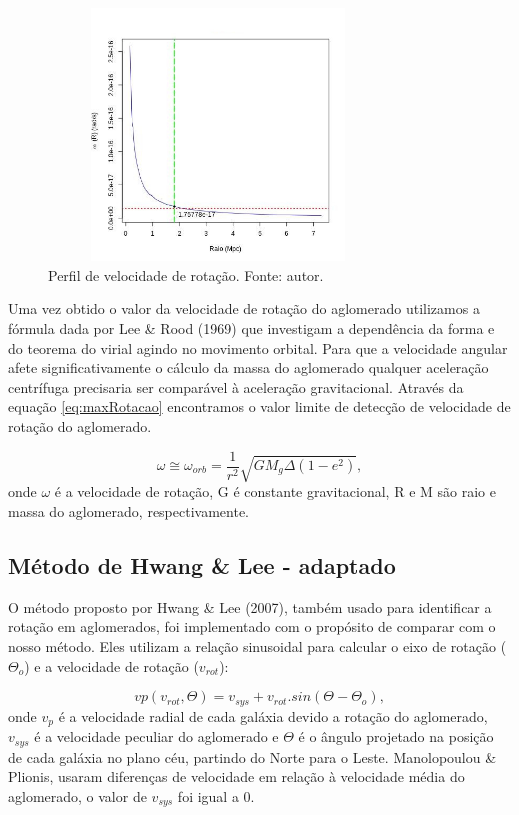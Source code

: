 \begin{figure}[!htbp] %
\vspace{-2pt}
\begin{center}
\includegraphics[height=6.7cm,width=9cm]{04-figuras/rotacao}%
\caption{Perfil de velocidade de rotação. Fonte: autor.}
\label{rotacao}%
\end{center}
\end{figure}

Uma vez obtido o valor da velocidade de rotação do aglomerado utilizamos a fórmula dada por Lee \& Rood (1969) que investigam a dependência da forma e do teorema do virial agindo no movimento orbital. Para que a velocidade angular afete significativamente o cálculo da massa do aglomerado qualquer aceleração centrífuga precisaria ser comparável à aceleração gravitacional. Através da equação \ref{eq:maxRotacao} encontramos o valor limite de detecção de velocidade de rotação do aglomerado.

\begin{equation}
\omega \cong \omega_{orb} = \frac{1}{r^2} \sqrt{G M_g \Delta (1 - e^2)}, 
\label{eq:maxRotacao}
\end{equation}
onde $\omega$ é a velocidade de rotação, G é constante gravitacional, R e M são raio e massa do aglomerado, respectivamente. 

\subsection{Método de Hwang \& Lee - adaptado}

O método proposto por Hwang \& Lee (2007), também usado para identificar a rotação em aglomerados, foi implementado com o propósito de comparar com o nosso método. Eles utilizam a relação sinusoidal para calcular o eixo de rotação ($\Theta_o$) e a velocidade de rotação ($v_{rot}$):

\begin{equation}
 vp(v_{rot}, \Theta) = v_{sys} + v_{rot} . sin(\Theta - \Theta_o) ,
 \label{eq:hwanglee1}
\end{equation}
onde $v_p$ é a velocidade radial de cada galáxia devido a rotação do aglomerado, $v_{sys}$ é a velocidade peculiar do aglomerado e $\Theta$ é o ângulo projetado na posição de cada galáxia no plano céu, partindo do Norte para o Leste. Manolopoulou \&  Plionis, usaram diferenças de velocidade em relação à velocidade média do aglomerado, o valor de $v_{sys}$ foi igual a 0.


